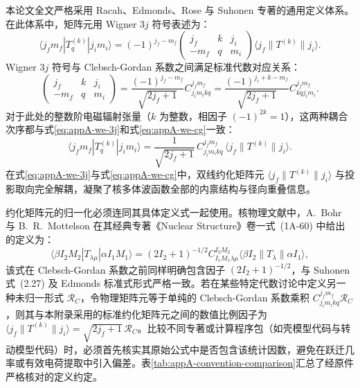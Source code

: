本论文全文严格采用 Racah、Edmonds、Rose 与 Suhonen 专著的通用定义体系。在此体系中，矩阵元用 Wigner $3j$ 符号表述为：
\begin{equation}\label{eq:appA-we-3j}
\langle j_f m_f | T_q^{(k)} | j_i m_i \rangle = (-1)^{j_f - m_f} \begin{pmatrix} j_f & k & j_i \\ -m_f & q & m_i \end{pmatrix} \langle j_f \| T^{(k)} \| j_i \rangle .
\end{equation}
Wigner $3j$ 符号与 Clebsch-Gordan 系数之间满足标准代数对应关系：
\begin{equation}\label{eq:appA-3j-cg-relation}
\begin{pmatrix} j_f & k & j_i \\ -m_f & q & m_i \end{pmatrix} = \frac{(-1)^{j_f - m_f}}{\sqrt{2j_f + 1}} C_{j_i m_i k q}^{j_f m_f} = \frac{(-1)^{j_i + k - m_f}}{\sqrt{2j_f + 1}} C_{k q j_i m_i}^{j_f m_f} .
\end{equation}
对于此处的整数阶电磁辐射张量（$k$ 为整数，相因子 $(-1)^{2k} = 1$），这两种耦合次序都与式\eqref{eq:appA-we-3j}和式\eqref{eq:appA-we-cg}一致：
\begin{equation}\label{eq:appA-we-cg}
\langle j_f m_f | T_q^{(k)} | j_i m_i \rangle = \frac{1}{\sqrt{2j_f + 1}} \, C_{j_i m_i k q}^{j_f m_f} \, \langle j_f \| T^{(k)} \| j_i \rangle .
\end{equation}
在式\eqref{eq:appA-we-3j}与式\eqref{eq:appA-we-cg}中，双线约化矩阵元 $\langle j_f \| T^{(k)} \| j_i \rangle$ 与投影取向完全解耦，凝聚了核多体波函数全部的内禀结构与径向重叠信息。

约化矩阵元的归一化必须连同其具体定义式一起使用。核物理文献中，A.~Bohr 与 B.~R.~Mottelson 在其经典专著《Nuclear Structure》卷一式~(1A-60) 中给出的定义为：
\begin{equation}\label{eq:appA-we-bm}
\langle \beta I_2 M_2 | T_{\lambda\mu} | \alpha I_1 M_1 \rangle = (2I_2 + 1)^{-1/2} C_{I_1 M_1 \lambda \mu}^{I_2 M_2} \langle \beta I_2 \| T_\lambda \| \alpha I_1 \rangle ,
\end{equation}
该式在 Clebsch-Gordan 系数之前同样明确包含因子 $(2I_2 + 1)^{-1/2}$，与 Suhonen 式~(2.27) 及 Edmonds 标准式形式严格一致。若在某些特定代数讨论中定义另一种未归一形式 $\mathcal{R}_C$，令物理矩阵元等于单纯的 Clebsch-Gordan 系数乘积 $C_{j_i m_i k q}^{j_f m_f} \mathcal{R}_C$，则其与本附录采用的标准约化矩阵元之间的数值比例因子为 $\langle j_f \| T^{(k)} \| j_i \rangle = \sqrt{2j_f + 1}\,\mathcal{R}_C$。比较不同专著或计算程序包（如壳模型代码与转动模型代码）时，必须首先核实其原始公式中是否包含该统计因数，避免在跃迁几率或有效电荷提取中引入偏差。表\ref{tab:appA-convention-comparison}汇总了经原件严格核对的定义约定。

